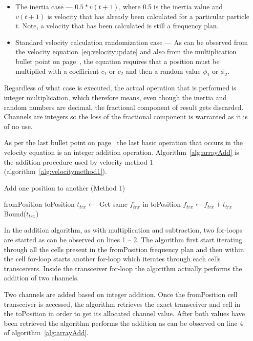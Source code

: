 \begin{itemize}
\item The inertia case --- $0.5 * v(t+1)$, where 0.5 is the inertia value and $v(t+1)$ is velocity that has already been calculated for a particular particle $t$. Note, a velocity that has been calculated is still a frequency plan.
\item Standard velocity calculation randomization case --- As can be observed from the velocity equation~\ref{eq:velocityupdate} and also from the multiplication bullet point on page~\pageref{lst:velocitybreakup}, the equation requires that a position must be multiplied with a coefficient $c_1$ or $c_2$ and then a random value $\phi_1$ or $\phi_2$. 
\end{itemize}

Regardless of what case is executed, the actual operation that is performed is integer multiplication, which therefore means, even though the inertia and random numbers are decimal, the fractional component of result gets discarded. Channels are integers so the loss of the fractional component is warranted as it is of no use.

As per the last bullet point on page~\pageref{lst:velocitybreakup} the last basic operation that occurs in the velocity equation is an integer addition operation. Algorithm~\ref{alg:arrayAdd} is the addition procedure used by velocity method 1 (algorithm~\ref{alg:velocitymethod1}).
\begin{algorithm}
\caption{Add one position to another (Method 1)}
\label{alg:arrayAdd}
\begin{algorithmic}[1]
	\REQUIRE fromPosition
	\REQUIRE toPosition
			\STATE $t_{trx} \leftarrow$ Get same $f_{trx}$ in toPosition
			\STATE $f_{trx} \leftarrow f_{trx} + t_{trx}$
			\STATE Bound($t_{trx}$)
		\ENDFOR
	\ENDFOR
\end{algorithmic}
\end{algorithm}

In the addition algorithm, as with multiplication and subtraction, two for-loops are started as can be observed on lines 1 -- 2. The algorithm first start iterating through all the cells present in the fromPosition frequency plan and then within the cell for-loop starts another for-loop which iterates through each cells transceivers. Inside the transceiver for-loop the algorithm actually performs the addition of two channels.

Two channels are added based on integer addition. Once the fromPosition cell transceiver is accessed, the algorithm retrieves the exact transceiver and cell in the toPosition in order to get its allocated channel value. After both values have been retrieved the algorithm performs the addition as can be observed on line 4 of algorithm~\ref{alg:arrayAdd}.

